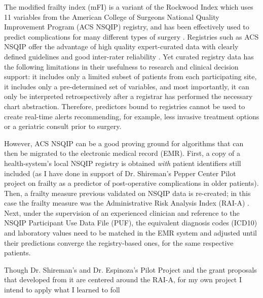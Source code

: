 The modified frailty index (mFI) is a variant of the Rockwood Index which uses 11 variables from the American College of Surgeons National Quality Improvement Program (ACS NSQIP) registry, and has been effectively used to predict complications for many different types of surgery \cite{Uppal_2015,Tsiouris_2013,Bellamy_2017,22491599,23711971,23949353}. Registries such as ACS NSQIP offer the advantage of high quality expert-curated data with clearly defined guidelines and good inter-rater reliability \cite{Shiloach_2010}. Yet curated registry data has the following limitations in their usefulness to research and clinical decision support: it includes only a limited subset of patients from each participating site, it includes only a pre-determined set of variables, and most importantly, it can only be interpreted retrospectively after a registrar has performed the necessary chart abstraction. Therefore, predictors bound to registries cannot be used to create real-time alerts recommending, for example, less invasive treatment options or a geriatric consult prior to surgery.

However, ACS NSQIP can be a good proving ground for algorithms that can then be migrated to the electronic medical record (EMR). First, a copy of a health-system's local NSQIP registry is obtained \textit{with} patient identifiers still included (as I have done in support of Dr. Shireman's Pepper Center Pilot project on frailty as a predictor of post-operative complications in older patients). Then, a frailty measure previous validated on NSQIP data is re-created; in this case the frailty measure was the Administrative Risk Analysis Index (RAI-A) \cite{Hall_2017,Johnson_2014,Melin_2015,Gupta_2011}. Next, under the supervision of an experienced clinician and reference to the NSQIP Participant Use Data File (PUF), the equivalent diagnosis codes (ICD10) and laboratory values need to be matched in the EMR system and adjusted until their predictions converge the registry-based ones, for the same respective patients.

Though Dr. Shireman's and Dr. Espinoza's Pilot Project and the grant proposals that developed from it are centered around the RAI-A, for my own project I intend to apply what I learned to foll 
